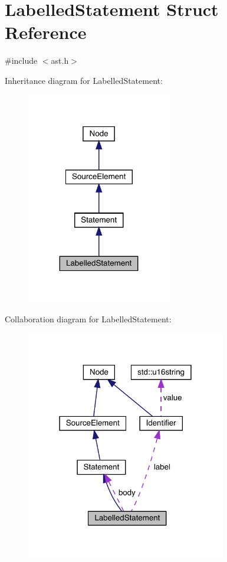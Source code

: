 \hypertarget{struct_labelled_statement}{}\section{Labelled\+Statement Struct Reference}
\label{struct_labelled_statement}


{\ttfamily \#include $<$ast.\+h$>$}



Inheritance diagram for Labelled\+Statement\+:
\nopagebreak
\begin{figure}[H]
\begin{center}
\leavevmode
\includegraphics[width=179pt]{struct_labelled_statement__inherit__graph}
\end{center}
\end{figure}


Collaboration diagram for Labelled\+Statement\+:
\nopagebreak
\begin{figure}[H]
\begin{center}
\leavevmode
\includegraphics[width=247pt]{struct_labelled_statement__coll__graph}
\end{center}
\end{figure}

